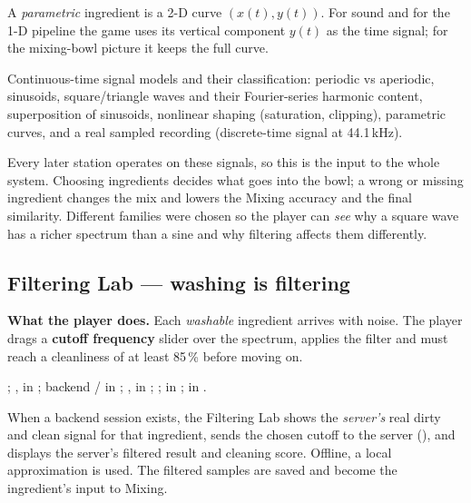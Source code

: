 \documentclass[11pt,a4paper]{article}
\begin{document}
A \emph{parametric} ingredient is a 2-D curve $(x(t),y(t))$. For sound and for the
1-D pipeline the game uses its vertical component $y(t)$ as the time signal; for the
mixing-bowl picture it keeps the full curve.

\begin{conceptbox}
Continuous-time signal models and their classification: periodic vs aperiodic,
sinusoids, square/triangle waves and their Fourier-series harmonic content,
superposition of sinusoids, nonlinear shaping (saturation, clipping), parametric
curves, and a real sampled recording (discrete-time signal at 44.1\,kHz).
\end{conceptbox}
\begin{impactbox}
Every later station operates on these signals, so this is the input to the whole
system. Choosing ingredients decides what goes into the bowl; a wrong or missing
ingredient changes the mix and lowers the Mixing accuracy and the final similarity.
Different families were chosen so the player can \emph{see} why a square wave has
a richer spectrum than a sine and why filtering affects them differently.
\end{impactbox}

\subsection{Filtering Lab --- washing is filtering}
\textbf{What the player does.} Each \emph{washable} ingredient arrives with noise.
The player drags a \textbf{cutoff frequency} slider over the spectrum, applies the
filter and must reach a cleanliness of at least 85\,\% before moving on.

\begin{filesbox}
; ,  in
; backend  / 
in ; , 
in ; ;
 in ;  in
.
\end{filesbox}

When a backend session exists, the Filtering Lab shows the \emph{server's} real
dirty and clean signal for that ingredient, sends the chosen cutoff to the server
(), and displays the server's filtered result and cleaning
score. Offline, a local approximation is used. The filtered samples are saved and
become the ingredient's input to Mixing.
\end{document}
